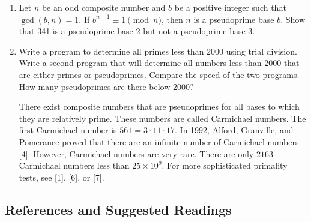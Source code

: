 {\begin{enumerate}
\vspace{2pt}        %
 
 
\bf\item\rm
Let $n$ be an odd composite number and $b$ be a positive integer such
that $\gcd(b, n) = 1$. If $b^{n-1} \equiv 1 \pmod{n}$, then $n$ is a
{\bfi pseudoprime base} $b$. Show that 341 is a pseudoprime base 2 but
not a pseudoprime base 3.
 
 
\bf\item\rm
Write a program to determine all primes less than 2000 using
trial division. Write a second program that will determine all numbers
less than 2000 that are either primes or pseudoprimes. Compare the
speed of the two programs.  How many pseudoprimes are there below
2000? 
 
 
There exist composite numbers that are pseudoprimes for all bases to
which they are relatively prime.  These numbers are called {\bfi
Carmichael numbers}. The first Carmichael
number is $561 = 3 \cdot 11 \cdot 17$.  In 1992, Alford, Granville, and
Pomerance proved that there are an infinite number of Carmichael
numbers [4].  However, Carmichael numbers are very rare.  There are
only $2163$ Carmichael numbers less than $25 \times 10^9$. For more
sophisticated primality tests, see [1], [6], or [7].  
 
 
\end{enumerate}
}
 
 
\subsection*{References and Suggested Readings}
 
